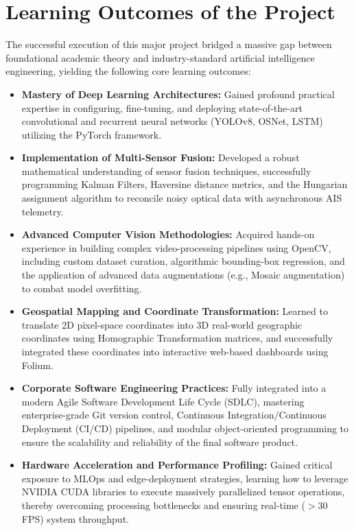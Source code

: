 \section{Learning Outcomes of the Project}
The successful execution of this major project bridged a massive gap between foundational academic theory and industry-standard artificial intelligence engineering, yielding the following core learning outcomes:
\begin{itemize}
    \item \textbf{Mastery of Deep Learning Architectures:} Gained profound practical expertise in configuring, fine-tuning, and deploying state-of-the-art convolutional and recurrent neural networks (YOLOv8, OSNet, LSTM) utilizing the PyTorch framework.
    \item \textbf{Implementation of Multi-Sensor Fusion:} Developed a robust mathematical understanding of sensor fusion techniques, successfully programming Kalman Filters, Haversine distance metrics, and the Hungarian assignment algorithm to reconcile noisy optical data with asynchronous AIS telemetry.
    \item \textbf{Advanced Computer Vision Methodologies:} Acquired hands-on experience in building complex video-processing pipelines using OpenCV, including custom dataset curation, algorithmic bounding-box regression, and the application of advanced data augmentations (e.g., Mosaic augmentation) to combat model overfitting.
    \item \textbf{Geospatial Mapping and Coordinate Transformation:} Learned to translate 2D pixel-space coordinates into 3D real-world geographic coordinates using Homographic Transformation matrices, and successfully integrated these coordinates into interactive web-based dashboards using Folium.
    \item \textbf{Corporate Software Engineering Practices:} Fully integrated into a modern Agile Software Development Life Cycle (SDLC), mastering enterprise-grade Git version control, Continuous Integration/Continuous Deployment (CI/CD) pipelines, and modular object-oriented programming to ensure the scalability and reliability of the final software product.
    \item \textbf{Hardware Acceleration and Performance Profiling:} Gained critical exposure to MLOps and edge-deployment strategies, learning how to leverage NVIDIA CUDA libraries to execute massively parallelized tensor operations, thereby overcoming processing bottlenecks and ensuring real-time ($>30$ FPS) system throughput.
\end{itemize}

